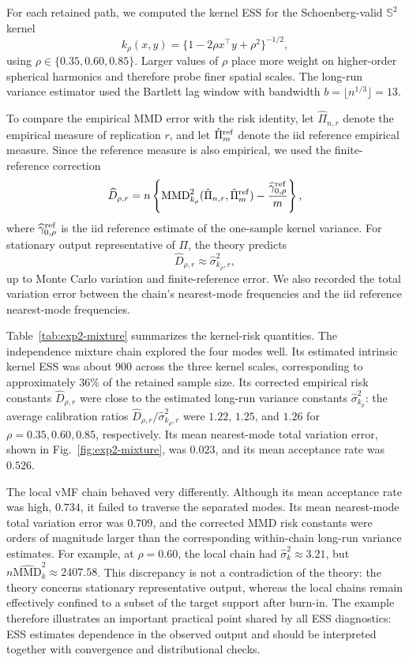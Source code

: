 \documentclass[11pt]{article}
\newcommand{\bbS}{\mathbb{S}}
\newcommand{\1}{\mathbf{1}}
\begin{document}
For each retained path, we computed the kernel ESS for the Schoenberg-valid \(\bbS^2\) kernel
\[
    k_\rho(x,y)
    =
    \{1-2\rho x^\top y+\rho^2\}^{-1/2},
\]
using \(\rho\in\{0.35,0.60,0.85\}\).  Larger values of \(\rho\) place more weight on higher-order spherical harmonics and therefore probe finer spatial scales.  The long-run variance estimator used the Bartlett lag window with bandwidth \(b=\lfloor n^{1/3}\rfloor=13\).

To compare the empirical MMD error with the risk identity, let \(\hat\Pi_{n,r}\) denote the empirical measure of replication \(r\), and let \(\hat\Pi_m^{\rm ref}\) denote the iid reference empirical measure.  Since the reference measure is also empirical, we used the finite-reference correction
\[
    \widehat D_{\rho,r}
    =
    n\left\{
    \mathrm{MMD}_{k_\rho}^2(\hat\Pi_{n,r},\hat\Pi_m^{\rm ref})
    -
    \frac{\widehat\gamma_{0,\rho}^{\rm ref}}{m}
    \right\},
\]
where \(\widehat\gamma_{0,\rho}^{\rm ref}\) is the iid reference estimate of the one-sample kernel variance.  For stationary output representative of \(\Pi\), the theory predicts
\[
    \widehat D_{\rho,r}\approx \widehat\sigma_{k_\rho,r}^2,
\]
up to Monte Carlo variation and finite-reference error.  We also recorded the total variation error between the chain's nearest-mode frequencies and the iid reference nearest-mode frequencies.

Table~\ref{tab:exp2-mixture} summarizes the kernel-risk quantities.  The independence mixture chain explored the four modes well.  Its estimated intrinsic kernel ESS was about \(900\) across the three kernel scales, corresponding to approximately \(36\%\) of the retained sample size.  Its corrected empirical risk constants \(\widehat D_{\rho,r}\) were close to the estimated long-run variance constants \(\widehat\sigma_{k_\rho}^2\): the average calibration ratios \(\widehat D_{\rho,r}/\widehat\sigma_{k_\rho,r}^2\) were \(1.22\), \(1.25\), and \(1.26\) for \(\rho=0.35,0.60,0.85\), respectively.  Its mean nearest-mode total variation error, shown in Fig.~\ref{fig:exp2-mixture}, was \(0.023\), and its mean acceptance rate was \(0.526\).

The local vMF chain behaved very differently.  Although its mean acceptance rate was high, \(0.734\), it failed to traverse the separated modes.  Its mean nearest-mode total variation error was \(0.709\), and the corrected MMD risk constants were orders of magnitude larger than the corresponding within-chain long-run variance estimates.  For example, at \(\rho=0.60\), the local chain had \(\widehat\sigma_k^2\approx 3.21\), but \(n\widehat{\mathrm{MMD}}_k^2\approx 2407.58\).  This discrepancy is not a contradiction of the theory: the theory concerns stationary representative output, whereas the local chains remain effectively confined to a subset of the target support after burn-in.  The example therefore illustrates an important practical point shared by all ESS diagnostics: ESS estimates dependence in the observed output and should be interpreted together with convergence and distributional checks.
\end{document}
